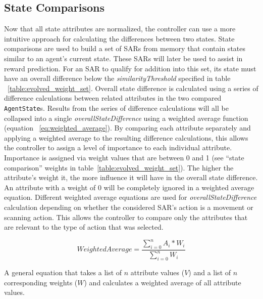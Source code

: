\subsection{State Comparisons} \label{subsec:state_comparisons}
Now that all state attributes are normalized, the controller can use a more intuitive approach for calculating the differences between two states.
State comparisons are used to build a set of SARs from memory that contain states similar to an agent's current state.
These SARs will later be used to assist in reward prediction.
For an SAR to qualify for addition into this set, its state must have an overall difference below the \textit{similarityThreshold} specified in table ~\ref{table:evolved_weight_set}.
Overall state difference is calculated using a series of difference calculations between related attributes in the two compared \texttt{AgentState}s.
Results from the series of difference calculations will all be collapsed into a single \textit{overallStateDifference} using a weighted average function (equation ~\ref{eq:weighted_average}).
By comparing each attribute separately and applying a weighted average to the resulting difference calculations, this allows the controller to assign a level of importance to each individual attribute.
Importance is assigned via weight values that are between 0 and 1 (see ``state comparison'' weights in table~\ref{table:evolved_weight_set}).
The higher the attribute's weight it, the more influence it will have in the overall state difference.
An attribute with a weight of 0 will be completely ignored in a weighted average equation.
Different weighted average equations are used for \textit{overallStateDifference} calculation depending on whether the considered SAR's action is a movement or scanning action.
This allows the controller to compare only the attributes that are relevant to the type of action that was selected.

\begin{capeq}
  \begin{equation} \label{eq:weighted_average}
    WeightedAverage = \frac{\sum_{i=0}^{n} A_{i} * W_{i}}{\sum_{i=0}^{n} W_{i}}
  \end{equation}
  \caption{A general equation that takes a list of $n$ attribute values ($V$) and a list of $n$ corresponding weights ($W$) and calculates a weighted average of all attribute values.}
\end{capeq}

